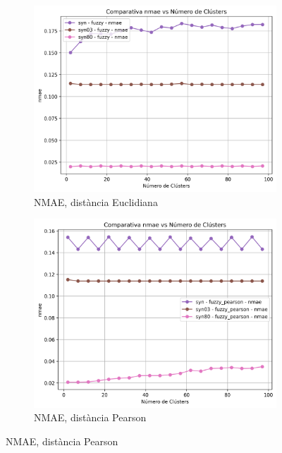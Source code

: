 \documentclass[a4paper,12pt]{report}
\begin{document}
\begin{figure}[H]
    \centering
    \begin{subfigure}[b]{0.49\textwidth}
        \includegraphics[width=\textwidth]{Figuras/nmae-fuzzy-sin.png}
        \caption{NMAE, distància Euclidiana}
        \label{fig:fuzzy-clustering-sin-results-a}
    \end{subfigure}
    \hfill
    \begin{subfigure}[b]{0.49\textwidth}
        \includegraphics[width=\textwidth]{Figuras/nmae-fuzzy_pearson-sin.png}
        \caption{NMAE, distància Pearson}
        \label{fig:fuzzy-clustering-sin-results-b}
    \end{subfigure}


\end{figure}
\end{document}
